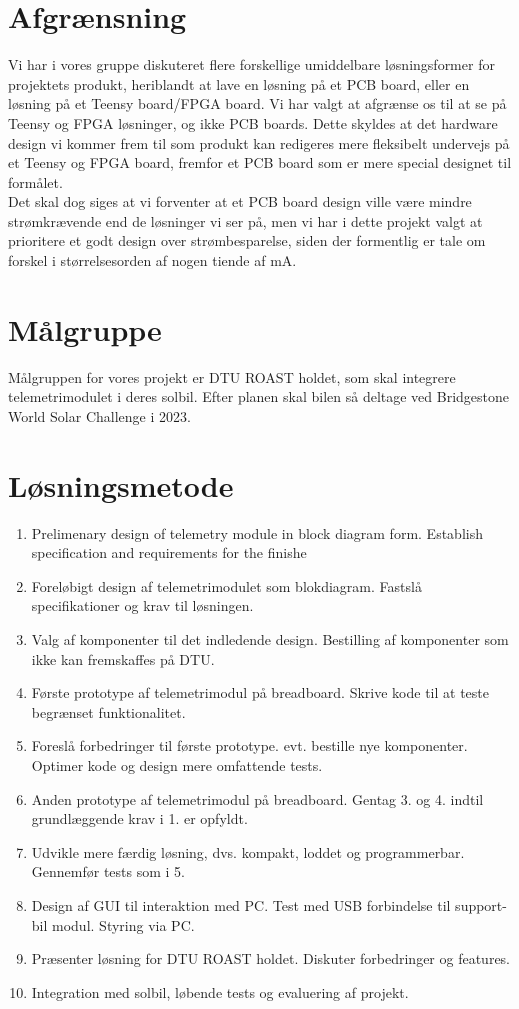 \documentclass[]{article}
\begin{document}
\section{Afgrænsning}
Vi har i vores gruppe diskuteret flere forskellige umiddelbare løsningsformer for projektets produkt, heriblandt at lave en løsning på et PCB board, eller en løsning på et Teensy board/FPGA board. Vi har valgt at afgrænse os til at se på Teensy og FPGA løsninger, og ikke PCB boards. Dette skyldes at det hardware design vi kommer frem til som produkt kan redigeres mere fleksibelt undervejs på et Teensy og FPGA board, fremfor et PCB board som er mere special designet til formålet.\\
Det skal dog siges at vi forventer at et PCB board design ville være mindre strømkrævende end de løsninger vi ser på, men vi har i dette projekt valgt at prioritere et godt design over strømbesparelse, siden der formentlig er tale om forskel i størrelsesorden af nogen tiende af mA.
\section{Målgruppe}
Målgruppen for vores projekt er DTU ROAST holdet, som skal integrere telemetrimodulet i deres solbil. Efter planen skal bilen så deltage ved Bridgestone World Solar Challenge i 2023.
\section{Løsningsmetode}
\begin{enumerate}
    \item Prelimenary design of telemetry module in block diagram form. Establish specification and requirements for the finishe
    \item Foreløbigt design af telemetrimodulet som blokdiagram. Fastslå specifikationer og krav til løsningen. 
    \item Valg af komponenter til det indledende design. Bestilling af komponenter som ikke kan fremskaffes på DTU. 
    \item Første prototype af telemetrimodul på breadboard. Skrive kode til at teste begrænset funktionalitet. 
    \item Foreslå forbedringer til første prototype. evt. bestille nye komponenter. Optimer kode og design mere omfattende tests.
    \item Anden prototype af telemetrimodul på breadboard. Gentag 3. og 4. indtil grundlæggende krav i 1. er opfyldt. 
    \item Udvikle mere færdig løsning, dvs. kompakt, loddet og programmerbar. Gennemfør tests som i 5. 
    \item Design af GUI til interaktion med PC. Test med USB forbindelse til support-bil modul. Styring via PC.  
    \item Præsenter løsning for DTU ROAST holdet. Diskuter forbedringer og features. 
    \item Integration med solbil, løbende tests og evaluering af projekt. 
\end{enumerate}
\end{document}
